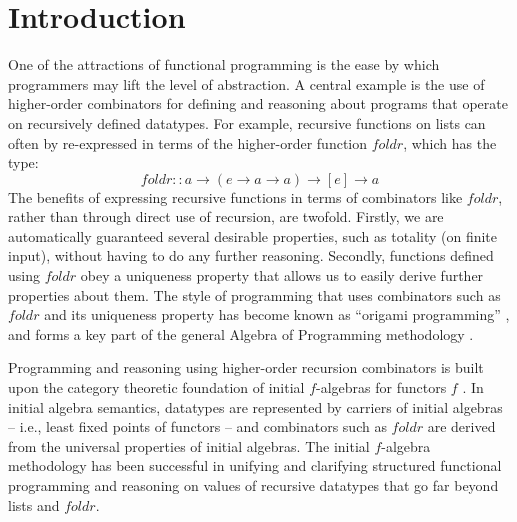 \documentclass{jfp1}
\begin{document}
\section{Introduction}

One of the attractions of functional programming is the ease by which
programmers may lift the level of abstraction. A central example is
the use of higher-order combinators for defining and reasoning about
programs that operate on recursively defined datatypes. For example,
recursive functions on lists can often by re-expressed in terms of the
higher-order function $\mathit{foldr}$, which has the type:
\begin{displaymath}
  \mathit{foldr} :: a \to (e \to a \to a) \to [e] \to a
\end{displaymath}
The benefits of expressing recursive functions in terms of combinators
like $\mathit{foldr}$, rather than through direct use of recursion,
are twofold. Firstly, we are automatically guaranteed several
desirable properties, such as totality (on finite input), without
having to do any further reasoning. Secondly, functions defined using
$\mathit{foldr}$ obey a uniqueness property that allows us to easily
derive further properties about them. The style of
programming that uses combinators such as $\mathit{foldr}$ and its
uniqueness property has become known as ``origami programming''
\cite{gibbons03origami}, and forms a key part of the general Algebra
of Programming methodology \cite{bdm97}.

Programming and reasoning using higher-order recursion combinators is
built upon the category theoretic foundation of initial $f$-algebras
for functors $f$ \cite{GoguenTW78}. In initial algebra semantics,
datatypes are represented by carriers of initial algebras --
i.e., least fixed points of functors -- and combinators such as
$\mathit{foldr}$ are derived from the universal properties of initial
algebras. The initial $f$-algebra methodology has been successful in
unifying and clarifying structured functional programming and
reasoning on values of recursive datatypes that go far beyond lists
and $\mathit{foldr}$.
\end{document}
